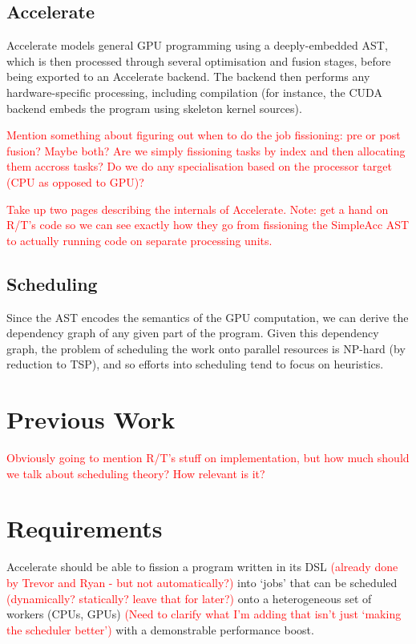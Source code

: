 \documentclass[a4paper,12pt]{article}
\newcommand{\red}[1]{\textcolor{red}{#1}}
\begin{document}
\begin{multicols}{2}
\subsection{Accelerate}

Accelerate models general GPU programming using a deeply-embedded AST, which is then processed through several optimisation and fusion stages, before being exported to an Accelerate backend. The backend then performs any hardware-specific processing, including compilation (for instance, the CUDA backend embeds the program using skeleton kernel sources).

\red{Mention something about figuring out when to do the job fissioning: pre or post fusion? Maybe both? Are we simply fissioning tasks by index and then allocating them accross tasks? Do we do any specialisation based on the processor target (CPU as opposed to GPU)?}

\red{Take up two pages describing the internals of Accelerate. Note: get a hand on R/T's code so we can see exactly how they go from fissioning the SimpleAcc AST to actually running code on separate processing units.}

\subsection{Scheduling}

Since the AST encodes the semantics of the GPU computation, we can derive the dependency graph of any given part of the program. Given this dependency graph, the problem of scheduling the work onto parallel resources is NP-hard (by reduction to TSP), and so efforts into scheduling tend to focus on heuristics.


\section{Previous Work}

\red{Obviously going to mention R/T's stuff on implementation, but how much should we talk about scheduling theory? How relevant is it?}

\section{Requirements}

Accelerate should be able to fission a program written in its DSL \red{(already done by Trevor and Ryan - but not automatically?)} into `jobs' that can be scheduled \red{(dynamically? statically? leave that for later?)} onto a heterogeneous set of workers (CPUs, GPUs) \red{(Need to clarify what I'm adding that isn't just `making the scheduler better')} with a demonstrable performance boost.


\end{multicols}
\end{document}
